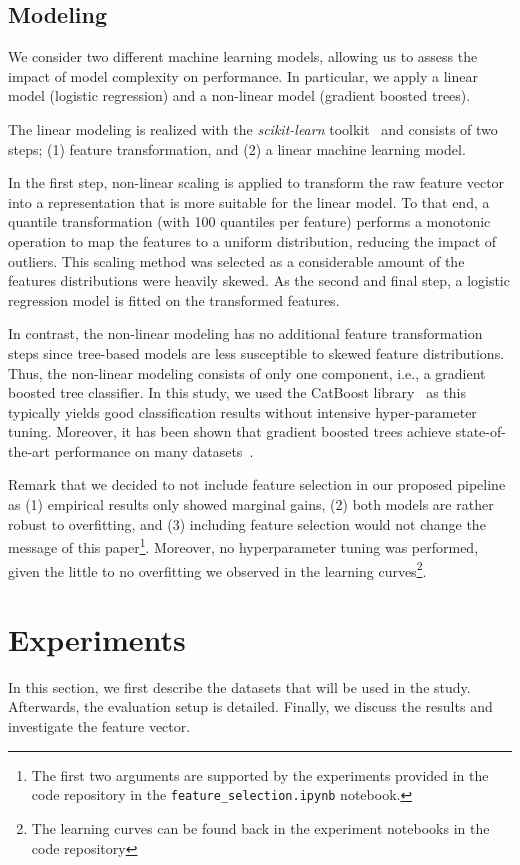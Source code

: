 \documentclass[runningheads]{llncs}
\begin{document}
\subsection{Modeling}
We consider two different machine learning models, allowing us to assess the impact of model complexity on performance. In particular, we apply a linear model (logistic regression) and a non-linear model (gradient boosted trees).

The linear modeling is realized with the \textit{scikit-learn} toolkit~\cite{pedregosa2011scikit} and consists of two steps; (1) feature transformation, and (2) a linear machine learning model. 

In the first step, non-linear scaling is applied to transform the raw feature vector into a representation that is more suitable for the linear model. To that end, a quantile transformation (with 100 quantiles per feature) performs a monotonic operation to map the features to a uniform distribution, reducing the impact of outliers. This scaling method was selected as a considerable amount of the features distributions were heavily skewed.
As the second and final step, a logistic regression model is fitted on the transformed features.  

In contrast, the non-linear modeling has no additional feature transformation steps since tree-based models are less susceptible to skewed feature distributions. Thus, the non-linear modeling consists of only one component, i.e., a gradient boosted tree classifier. In this study, we used the CatBoost library~\cite{dorogush2018catboost} as this typically yields good classification results without intensive hyper-parameter tuning. Moreover, it has been shown that gradient boosted trees achieve state-of-the-art performance on many datasets~\cite{chen2016xgboost}.

Remark that we decided to not include feature selection in our proposed pipeline as (1) empirical results only showed marginal gains, (2) both models are rather robust to overfitting, and (3) including feature selection would not change the message of this paper\footnote{The first two arguments are supported by the experiments provided in the code repository in the \texttt{feature\_selection.ipynb} notebook.}. Moreover, no hyperparameter tuning was performed, given the little to no overfitting we observed in the learning curves\footnote{The learning curves can be found back in the experiment notebooks in the code repository}.  


\section{Experiments}\label{sec:experiments}
In this section, we first describe the datasets that will be used in the study. Afterwards, the evaluation setup is detailed. Finally, we discuss the results and investigate the feature vector.
\end{document}
